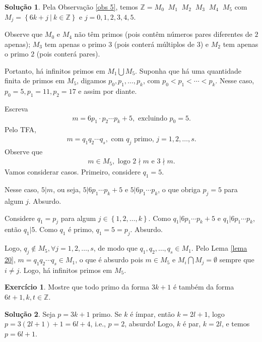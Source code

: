 \documentclass[a4paper,11pt,twoside, leqno]{article}
\theoremstyle{definition}
\newtheorem{exercise}{Exercício}
\newtheorem*{solution}{Solução}
\begin{document}
\begin{solution}
	Pela Observação \eqref{obs 5}, temos $\mathbb{Z} = M_0\mathop{\dot\bigcup} M_1 \mathop{\dot\bigcup} M_2\mathop{\dot\bigcup} M_3 \mathop{\dot\bigcup} M_4 \mathop{\dot\bigcup} M_5$ com $M_j = \left\{ 6k + j \ | \ k\in\mathbb{Z} \right\}$ e $j = 0,1,2,3,4,5$. 
	
	Observe que $M_0$ e $M_4$ não têm primos (pois contêm números pares diferentes de $2$ apenas); $M_3$ tem apenas o primo $3$ (pois conterá múltiplos de $3$) e $M_2$ tem apenas o primo $2$ (pois conterá pares).
	
	Portanto, há infinitos primos em $M_1\bigcup M_5$. Suponha que há uma quantidade finita de primos em $M_5$, digamos $p_0,p_1,\dots,p_k$, com $p_0 < p_1 < \cdots < p_k$. Nesse caso, $p_0 = 5, p_1 = 11, p_2 = 17$ e assim por diante.
	
	Escreva
	\begin{align*}
	m = 6p_1\cdot p_2\cdots p_k + 5, \text{ excluindo } p_0 = 5.
	\end{align*}
	Pelo TFA, 
	\begin{align*}
	m = q_1q_2\cdots q_s, \text{ com } q_j \text{ primo, } j=1,2,\dots,s.
	\end{align*}
	Observe que 
	\begin{align*}
	m\in M_5, \text{ logo } 2\nmid m \text{ e } 3\nmid m.
	\end{align*}
	Vamos considerar casos. Primeiro, considere $q_1 = 5$. 
	
	Nesse caso, $5|m$, ou seja, $5|6p_1\cdots p_k + 5$ e $5|6p_1\cdots p_k$, o que obriga $p_j = 5$ para algum $j$. Absurdo.
	
	Considere $q_1 = p_j$ para algum $j\in\left\{ 1,2,\dots,k \right\}$. Como $q_1|6p_1\cdots p_k + 5$ e $q_1|6p_1\cdots p_k$, então $q_1 | 5$. Como $q_1$ é primo, $q_1 = 5 = p_j$. Absurdo.
	
	Logo, $q_j\notin M_5, \forall j=1,2,\dots,s$, de modo que $q_1, q_2,\dots, q_s\in M_1$. Pelo Lema \eqref{lema 20}, $m = q_1q_2\cdots q_s\in M_1$, o que é absurdo pois $m\in M_5$ e $M_i\bigcap M_j = \emptyset$ sempre que $i\neq j$. Logo, há infinitos primos em $M_5$. 
\end{solution}
\begin{exercise}
	Mostre que todo primo da forma $3k+1$ é também da forma $6t+1, k,t\in\mathbb{Z}$.
\end{exercise}
\begin{solution}
	Seja $p = 3k + 1$ primo. Se $k$ é ímpar, então $k = 2l+1$, logo $p = 3(2l+1)+1 = 6l+4$, i.e., $p = 2$, absurdo! Logo, $k$ é par, $k=2l$, e temos $p = 6l+1$.
\end{solution}
\end{document}
